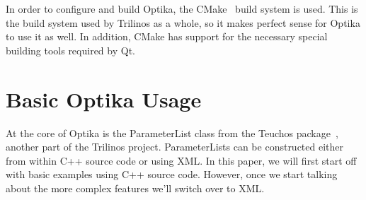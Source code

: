 In order to configure and build Optika, the CMake~\cite{cmake} build system is used. This is the build system
used by Trilinos as a whole, so it makes perfect sense for Optika to use it as well. In addition, CMake
has support for the necessary special building tools required by Qt.

\section{Basic Optika Usage}
At the core of Optika is the ParameterList class from the Teuchos package~\cite{TeuchosPackage}, another part
of the Trilinos project. ParameterLists can be constructed either from within C++ source code or using XML.
In this paper, we will first start off with basic examples using C++ source code. However, once we start
talking about the more complex features we'll switch over to XML.

